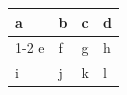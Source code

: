 \documentclass{article}
\begin{document}
\begin{tabular}{llll}
\toprule
a & b & c & d\\
\cmidrule[lr]{1-2} \cmidrule[lr]{3-4}
e & f & g & h\\
\addlinespace[2pt plus 1pt]
i & j & k & l\\
\bottomrule
\end{tabular}
\end{document}
